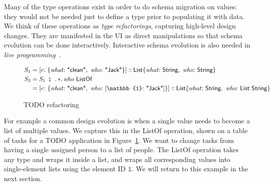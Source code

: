 \documentclass[english,submission]{programming}
\theoremstyle{definition}
\DeclareMathOperator{\exec}{\ \fatsemi\ \ }
\newcommand{\is}{{:}\ }
\newcommand{\comma}{,\ }
\newcommand{\isa}{\dblcolon}
\newcommand{\quotedstring}[1]{\textsf{\textquotedbl{#1}\textquotedbl}}
\begin{document}
Many of the type operations exist in order to do schema migration on values: they would not be needed just to define a type prior to populating it with data. We think of these operations as \textit{type refactorings}, capturing high-level design changes. They are manifested in the UI as direct manipulations so that schema evolution can be done interactively. Interactive schema evolution is also needed in \textit{live programming}~\cite{challenge-problems}.

\begin{figure}[]
  \vspace{-20pt}
\begin{align*}
  S_1 &= [
    e \is \{ \mathit{what}\is \quotedstring{clean}\comma  \mathit{who}\is \quotedstring{Jack} \}
    ] \isa
    \textsf{List}\{ \mathit{what}\is \textsf{String}\comma \mathit{who}\is \textsf{String} \}\\
S_2 &= S_1 \exec \ldotp *\ldotp \mathit{who} \textsf{ ListOf } \\
 &= [
    e \is \{ \mathit{what}\is \quotedstring{clean}\comma  \mathit{who}\is [\mathbb{1}\is \quotedstring{Jack}] \}
    ] \isa
    \textsf{List}\{ \mathit{what}\is \textsf{String}\comma  \mathit{who}\is \textsf{List String} \}\\
\end{align*}
\vspace{-40pt}
\caption{TODO refactoring}
\label{fig:TODO-refactor}
\end{figure}

For example a common design evolution is when a single value needs to become a list of multiple values. We capture this in the \textsf{ListOf} operation, shown on a table of tasks for a TODO application in Figure~\ref{fig:TODO-refactor}. We want to change tasks from having a single assigned person to a list of people.
The \textsf{ListOf} operation takes any type and wraps it inside a list, and wraps all corresponding values into single-element lists using the element ID $\mathbb{1}$. We will return to this example in the next section.


\end{document}
